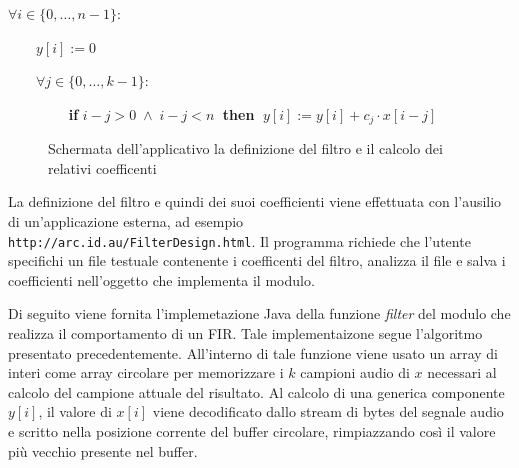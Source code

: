 \documentclass[a4papper]{article}
\begin{document}
$ \forall i \in \{0, \dots, n-1\} :$

$ \qquad y[i] := 0 $

$ \qquad\forall j \in \{0, \dots, k-1\} :$

$ \qquad \qquad $ \textbf{if} $ i-j > 0 \; \land \; i-j < n \; $ \textbf{then} $ \; y[i] := y[i] + c_j \cdot x[i-j] $
\\

\begin{figure}[!b]
  \centering
  \caption{Schermata dell'applicativo la definizione del filtro e il
    calcolo dei relativi coefficenti}
  \label{}
\end{figure}

La definizione del filtro e quindi dei suoi coefficienti viene
effettuata con l'ausilio di un'applicazione esterna, ad esempio\\
\verb+http://arc.id.au/FilterDesign.html+. Il programma richiede che
l'utente specifichi un file testuale contenente i coefficenti del
filtro, analizza il file e salva i coefficienti nell'oggetto che
implementa il modulo.

Di seguito viene fornita l'implemetazione Java della funzione
\emph{filter} del modulo che realizza il comportamento di un FIR. Tale
implementaizone segue l'algor\-itmo presentato
precedentemente. All'interno di tale funzione viene usato un array di
interi come array circolare per memorizzare i $k$ campioni audio di
$x$ necessari al calcolo del campione attuale del risultato. Al
calcolo di una generica componente $y[i]$, il valore di $x[i]$ viene
decodificato dallo stream di bytes del segnale audio e scritto nella
posizione corrente del buffer circolare, rimpiazzando cos\`i il valore
pi\`u vecchio presente nel buffer.
\end{document}
